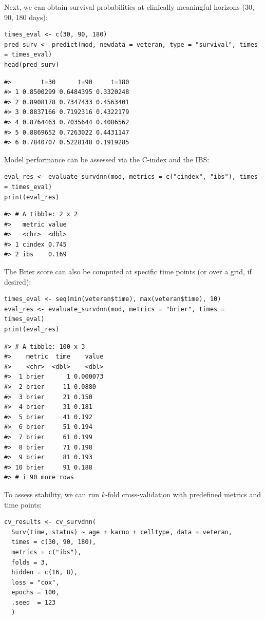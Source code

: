 Next, we can obtain survival probabilities at clinically meaningful horizons (30, 90, 180 days):

\begin{verbatim}
times_eval <- c(30, 90, 180)
pred_surv <- predict(mod, newdata = veteran, type = "survival", times = times_eval)
head(pred_surv)
\end{verbatim}

\begin{verbatim}
#>        t=30      t=90     t=180
#> 1 0.8500299 0.6484395 0.3320248
#> 2 0.8908178 0.7347433 0.4563401
#> 3 0.8837166 0.7192316 0.4322179
#> 4 0.8764463 0.7035644 0.4086562
#> 5 0.8869652 0.7263022 0.4431147
#> 6 0.7840707 0.5228148 0.1919285
\end{verbatim}

Model performance can be assessed via the C-index and the IBS:

\begin{verbatim}
eval_res <- evaluate_survdnn(mod, metrics = c("cindex", "ibs"), times = times_eval)
print(eval_res)
\end{verbatim}

\begin{verbatim}
#> # A tibble: 2 x 2
#>   metric value
#>   <chr>  <dbl>
#> 1 cindex 0.745
#> 2 ibs    0.169
\end{verbatim}

The Brier score can also be computed at specific time points (or over a grid, if desired):

\begin{verbatim}
times_eval <- seq(min(veteran$time), max(veteran$time), 10)
eval_res <- evaluate_survdnn(mod, metrics = "brier", times = times_eval)
print(eval_res)
\end{verbatim}

\begin{verbatim}
#> # A tibble: 100 x 3
#>    metric  time    value
#>    <chr>  <dbl>    <dbl>
#>  1 brier      1 0.000073
#>  2 brier     11 0.0880  
#>  3 brier     21 0.150   
#>  4 brier     31 0.181   
#>  5 brier     41 0.192   
#>  6 brier     51 0.194   
#>  7 brier     61 0.199   
#>  8 brier     71 0.198   
#>  9 brier     81 0.193   
#> 10 brier     91 0.188   
#> # i 90 more rows
\end{verbatim}

To assess stability, we can run \(k\)‑fold cross‑validation with predefined metrics and time points:

\begin{verbatim}
cv_results <- cv_survdnn(
  Surv(time, status) ~ age + karno + celltype, data = veteran,
  times = c(30, 90, 180),
  metrics = c("ibs"),
  folds = 3,
  hidden = c(16, 8),
  loss = "cox",
  epochs = 100,
  .seed  = 123
  )
\end{verbatim}

